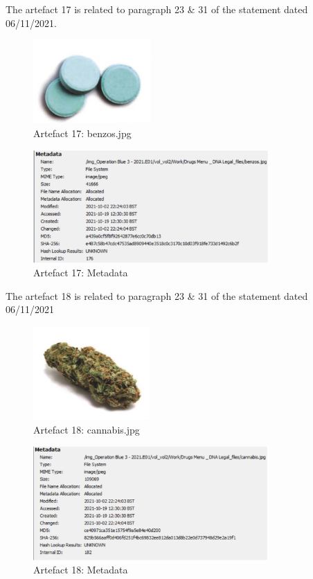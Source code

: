 The artefact 17 is related to paragraph 23 \& 31 of the statement dated
06/11/2021.
\begin{figure}[H]
  \centering
  \includegraphics[width=0.4\textwidth]{figures/artefact17}
  \caption{Artefact 17: benzos.jpg}
  \label{f:artefact17}
\end{figure}
\begin{figure}[H]
  \centering
  \includegraphics[width=0.8\textwidth]{figures/meta17}
  \caption{Artefact 17: Metadata}
  \label{f:meta17}
\end{figure}
The artefact 18 is related to paragraph 23 \& 31 of the statement dated
06/11/2021
\begin{figure}[H]
  \centering
  \includegraphics[width=0.4\textwidth]{figures/artefact18}
  \caption{Artefact 18: cannabis.jpg}
  \label{f:artefact18}
\end{figure}
\begin{figure}[H]
  \centering
  \includegraphics[width=0.8\textwidth]{figures/meta18}
  \caption{Artefact 18: Metadata}
  \label{f:meta18}
\end{figure}
